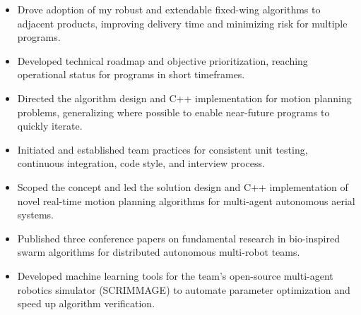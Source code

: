 \documentclass[10pt,a4paper,ragged2e,withhyper]{altacv}
\begin{document}
\begin{paracol}{2}

\begin{itemize}
\item Drove adoption of my robust and extendable fixed-wing algorithms to adjacent products, improving delivery time and minimizing risk for multiple programs.
\item Developed technical roadmap and objective prioritization, reaching operational status for programs in short timeframes.
\item Directed the algorithm design and C++ implementation for motion planning problems, generalizing where possible to enable near-future programs to quickly iterate.
\item Initiated and established team practices for consistent unit testing, continuous integration, code style, and interview process.
\end{itemize}

\divider

\begin{itemize}
\item Scoped the concept and led the solution design and C++ implementation of novel real-time motion planning algorithms for multi-agent autonomous aerial systems.
\item Published three conference papers on fundamental research in bio-inspired swarm algorithms for distributed autonomous multi-robot teams.
\item Developed machine learning tools for the team's open-source multi-agent robotics simulator (SCRIMMAGE) to automate parameter optimization and speed up algorithm verification.
\end{itemize}

\divider


\end{paracol}
\end{document}
